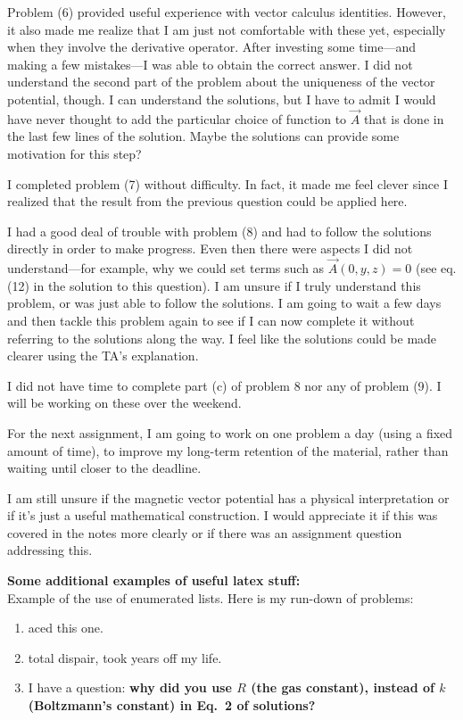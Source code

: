 \documentclass[11pt,usenames,dvipsnames]{article}
\begin{document}
Problem (6) provided useful experience with vector calculus identities.  However, it also made me realize that I am just not comfortable with these yet, especially when they involve the derivative operator.  After investing some time---and making a few mistakes---I was able to obtain the correct answer.  I did not understand the second part of the problem about the uniqueness of the vector potential, though.  I can understand the solutions, but I have to admit I would have never thought to add the particular choice of function to $\vec{A}$ that is done in the last few lines of the solution. Maybe the solutions can provide some motivation for this step?

I completed problem (7) without difficulty.  In fact, it made me feel clever since I realized that the result from the previous question could be applied here.

I had a good deal of trouble with problem (8) and had to follow the solutions directly in order to make progress.  Even then there were aspects I did not understand---for example, why we could set terms such as $\vec{A}(0,y,z)=0$ (see eq. (12) in the solution to this question).  I am unsure if I truly understand this problem, or was just able to follow the solutions.  I am going to wait a few days and then tackle this problem again to see if I can now complete it without referring to the solutions along the way. I feel like the solutions could be made clearer using the TA's explanation.

I did not have time to complete part (c) of problem 8 nor any of problem (9).  I will be working on these over the weekend.

For the next assignment, I am going to work on one problem a day (using a fixed amount of time), to improve my long-term retention of the material, rather than waiting until closer to the deadline.

I am still unsure if the magnetic vector potential has a physical interpretation or if it's just a useful mathematical construction. I would appreciate it if this was covered in the notes more clearly or if there was an assignment question addressing this.

\newpage

\noindent
{\bf Some additional examples of useful latex stuff:}\\

\noindent
Example of the use of enumerated lists.  Here is my run-down of problems:
\begin{enumerate} \itemsep0em
\item aced this one.
\item total dispair, took years off my life.
\item I have a question: \textbf{why did you use $R$ (the gas constant), instead of $k$ (Boltzmann's constant) in Eq.~2 of solutions?}
\end{enumerate}
\end{document}
